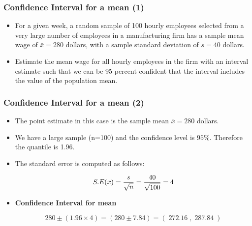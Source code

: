 \documentclass[a4]{beamer}
\begin{document}
\begin{frame}
\frametitle{Confidence Interval for a mean (1) }

\begin{itemize}
\item For a given week, a random sample of 100 hourly employees selected from a very large number of
employees in a manufacturing firm has a sample mean wage of $\bar{x} = 280$ dollars, with a sample standard deviation of
$s = 40$ dollars.
\item Estimate the mean wage for all hourly employees in the firm with an interval estimate such that we can be 95
percent confident that the interval includes the value of the population mean.
\end{itemize}

\end{frame}
\begin{frame}
\frametitle{Confidence Interval for a mean (2) }

\begin{itemize}
\item The point estimate in this case is the sample mean $\bar{x} = 280$ dollars.
\item We have a large sample (n=100) and the confidence level is $95\%$. Therefore the quantile  is 1.96.
\item The standard error is computed as follows:

\[ S.E( \bar{x} )  = {s \over \sqrt{n}}  =  {40 \over \sqrt{100}} = 4  \]
\item \textbf{Confidence Interval for mean}

\[
280 \pm (1.96 \times 4)  = (280 \pm 7.84) = (\;272.16\;,\;287.84\;)
\]

\end{itemize}
\end{frame}
\end{document}
